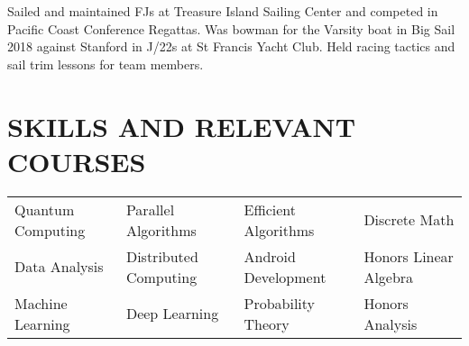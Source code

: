 \documentclass[10pt]{article}
\begin{document}
        {Sailed and maintained FJs at Treasure Island Sailing Center and competed in Pacific Coast Conference Regattas. Was bowman for the Varsity boat in Big Sail 2018 against Stanford in J/22s at St Francis Yacht Club. Held racing tactics and sail trim lessons for team members.}


                


\section*{SKILLS AND RELEVANT COURSES}
				\setlength{\columnsep}{.5pt}
				\begin{tabu}{X[2c]X[2.1c]X[2c]X[2c]}
					Quantum Computing    & Parallel Algorithms & Efficient Algorithms & Discrete Math \\
					Data Analysis 			   & Distributed Computing & Android Development & Honors Linear Algebra \\
          Machine Learning		   & Deep Learning & Probability Theory & Honors Analysis \\
				\end{tabu}
 
\end{document}

